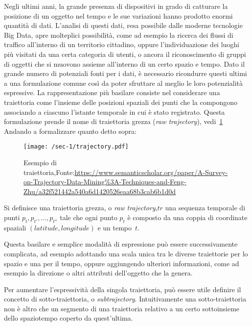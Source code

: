 Negli ultimi anni, la grande presenza di dispositivi in grado di catturare la posizione di un oggetto nel
tempo e le sue variazioni hanno prodotto enormi quantità di dati.
L'analisi di questi dati, resa possibile dalle moderne tecnologie Big Data, apre molteplici possibilità, come
ad esempio la ricerca dei flussi di traffico all'interno di un territorio cittadino, oppure l'individuazione
dei luoghi più visitati da una certa categoria di utenti, o ancora il riconoscimento di gruppi di oggetti che si
muovono assieme all'interno di un certo spazio e tempo.
Dato il grande numero di potenziali fonti per i dati, è necessario ricondurre questi ultimi a una formulazione comune
così da poter sfruttare al meglio le loro potenzialità espressive.
La rappresentazione più basilare consiste nel considerare una traiettoria come l'insieme delle posizioni
spaziali dei punti che la compongono associando a ciascuno l'istante temporale in cui è stato registrato.
Questa formulazione prende il nome di traiettoria grezza (\textit{raw trajectory}), vedi~\cref{fig:chap-1:trajectory}
Andando a formalizzare quanto detto sopra:

\begin{figure}
  \centering
  \texttt{[image: /sec-1/trajectory.pdf]}
  \caption{Esempio di traiettoria,Fonte:\url{https://www.semanticscholar.org/paper/A-Survey-on-Trajectory-Data-Mining\%3A-Techniques-and-Feng-Zhu/a32f521442a540a6d1420526eaa68b3cab6b1d0d}}%
  \label{fig:chap-1:trajectory}
\end{figure}

\begin{definition}[Traiettoria]

  Si definisce una traiettoria grezza, o \textit{raw trajectory},\(tr\) una sequenza temporale di punti \({p_{t}, p_{t'},\ldots, p_{t''}}\)
  tale che ogni punto \(p_{t}\) è composto da una coppia di coordinate spaziali \((latitude, longitude)\) e un tempo~\(t\).

\end{definition}

Questa basilare e semplice modalità di espressione può essere successivamente complicata, ad esempio adottando
una scala unica tra le diverse traiettorie per lo spazio e una per il tempo, oppure aggiungendo ulteriori informazioni, come ad esempio la direzione o altri attributi
dell'oggetto che la genera.

Per aumentare l'espressività della singola traiettoria, può essere utile definire il concetto di sotto-traiettoria, o \textit{subtrajectory}.
Intuitivamente una sotto-traiettoria non è altro che un segmento di una traiettoria relativo a un certo sottoinsieme dello spaziotempo coperto da quest'ultima.

